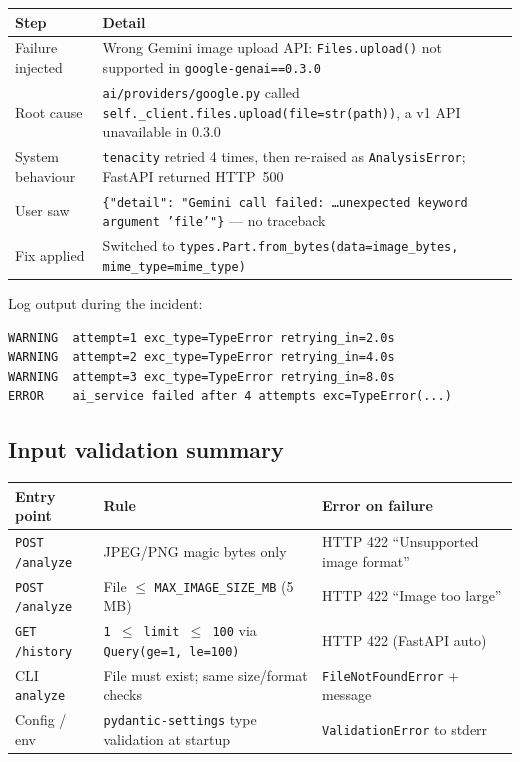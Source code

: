 \documentclass[11pt,a4paper]{article}
\begin{document}
\begin{center}\small
\begin{tabularx}{\textwidth}{@{} l X @{}}
\toprule
\textbf{Step} & \textbf{Detail} \\
\midrule
Failure injected  & Wrong Gemini image upload API: \texttt{Files.upload()} not supported in \texttt{google-genai==0.3.0} \\
Root cause        & \texttt{ai/providers/google.py} called \texttt{self.\_client.files.upload(file=str(path))}, a v1 API unavailable in 0.3.0 \\
System behaviour  & \texttt{tenacity} retried 4 times, then re-raised as \texttt{AnalysisError}; FastAPI returned HTTP~500 \\
User saw          & \texttt{\{"detail": "Gemini call failed: \ldots unexpected keyword argument 'file'"\}} --- no traceback \\
Fix applied       & Switched to \texttt{types.Part.from\_bytes(data=image\_bytes, mime\_type=mime\_type)} \\
\bottomrule
\end{tabularx}
\end{center}

Log output during the incident:
\begin{lstlisting}[style=bash]
WARNING  attempt=1 exc_type=TypeError retrying_in=2.0s
WARNING  attempt=2 exc_type=TypeError retrying_in=4.0s
WARNING  attempt=3 exc_type=TypeError retrying_in=8.0s
ERROR    ai_service failed after 4 attempts exc=TypeError(...)
\end{lstlisting}

\subsection{Input validation summary}

\begin{center}\small
\begin{tabularx}{\textwidth}{@{} l X l @{}}
\toprule
\textbf{Entry point} & \textbf{Rule} & \textbf{Error on failure} \\
\midrule
\texttt{POST /analyze} & JPEG/PNG magic bytes only & HTTP 422 ``Unsupported image format'' \\
\texttt{POST /analyze} & File $\le$ \texttt{MAX\_IMAGE\_SIZE\_MB} (5\,MB) & HTTP 422 ``Image too large'' \\
\texttt{GET /history}  & \texttt{1 $\le$ limit $\le$ 100} via \texttt{Query(ge=1, le=100)} & HTTP 422 (FastAPI auto) \\
CLI \texttt{analyze}   & File must exist; same size/format checks & \texttt{FileNotFoundError} + message \\
Config / env           & \texttt{pydantic-settings} type validation at startup & \texttt{ValidationError} to stderr \\
\bottomrule
\end{tabularx}
\end{center}
\end{document}
